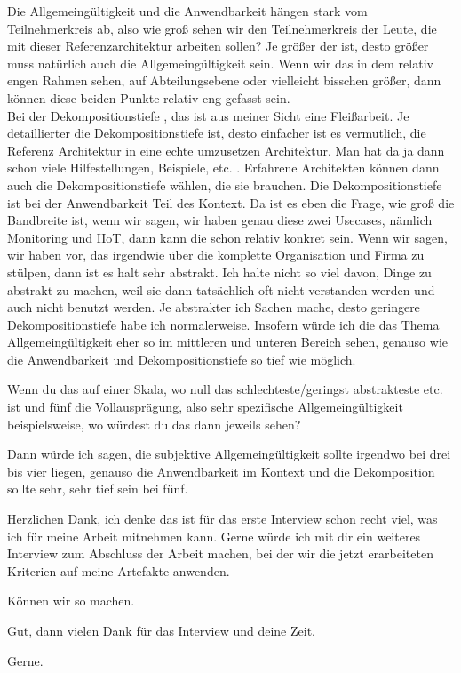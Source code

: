 \PA	 Die Allgemeingültigkeit und die Anwendbarkeit hängen stark vom Teilnehmerkreis ab, also wie groß sehen wir den Teilnehmerkreis der Leute, die mit dieser Referenzarchitektur arbeiten sollen? Je größer der ist, desto größer muss natürlich auch die Allgemeingültigkeit sein. Wenn wir das in dem relativ engen Rahmen sehen, auf Abteilungsebene oder vielleicht bisschen größer, dann können diese beiden Punkte relativ eng gefasst sein. \\
Bei der Dekompositionstiefe , das ist aus meiner Sicht eine Fleißarbeit. Je detaillierter die Dekompositionstiefe ist, desto einfacher ist es vermutlich, die Referenz Architektur in eine echte umzusetzen Architektur. Man hat da ja dann schon viele Hilfestellungen, Beispiele, etc. . Erfahrene Architekten können dann auch die Dekompositionstiefe wählen, die sie brauchen. Die Dekompositionstiefe ist bei der Anwendbarkeit Teil des Kontext. Da ist es eben die Frage, wie groß die Bandbreite ist, wenn wir sagen, wir haben genau diese zwei Usecases, nämlich Monitoring und \ac{IIoT}, dann kann die schon relativ konkret sein. Wenn wir sagen, wir haben vor, das irgendwie über die komplette Organisation und Firma zu stülpen, dann ist es halt sehr abstrakt. Ich halte nicht so viel davon, Dinge zu abstrakt zu machen, weil sie dann tatsächlich oft nicht verstanden werden und auch nicht benutzt werden. Je abstrakter ich Sachen mache, desto geringere Dekompositionstiefe habe ich normalerweise. Insofern würde ich die das Thema Allgemeingültigkeit eher so im mittleren und unteren Bereich sehen, genauso wie die Anwendbarkeit und Dekompositionstiefe so tief wie möglich.

\LF	Wenn du das auf einer Skala, wo null das schlechteste/geringst abstrakteste etc. ist und fünf die Vollausprägung, also sehr spezifische Allgemeingültigkeit beispielsweise, wo würdest du das dann jeweils sehen?

\PA	 Dann würde ich sagen, die subjektive Allgemeingültigkeit sollte irgendwo bei drei bis vier liegen, genauso die Anwendbarkeit im Kontext und die Dekomposition sollte sehr, sehr tief sein bei fünf.

\LF	 Herzlichen Dank, ich denke das ist für das erste Interview schon recht viel, was ich für meine Arbeit mitnehmen kann. Gerne würde ich mit dir ein weiteres Interview zum Abschluss der Arbeit machen, bei der wir die jetzt erarbeiteten Kriterien auf meine Artefakte anwenden.

\PA	 Können wir so machen.

\LF	Gut, dann vielen Dank für das Interview und deine Zeit.

\PA	 Gerne.